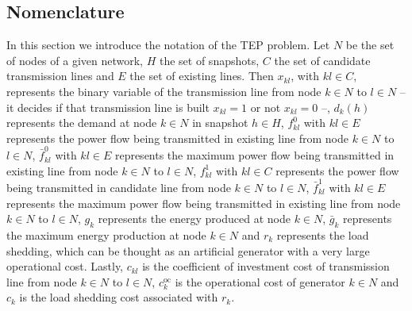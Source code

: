 \subsection{Nomenclature}
In this section we introduce the notation of the TEP problem. Let $N$ be the set of nodes of a given network, $H$ the set of snapshots, $C$ the set of candidate transmission lines and $E$ the set of existing lines. Then $x_{kl}$, with $kl \in C$, represents the binary variable of the transmission line from node $k\in N$ to $l\in N$ -- it decides if that transmission line is built $x_{kl} = 1$ or not $x_{kl} = 0$ --, $d_{k}(h)$ represents the demand at node $k\in N$ in snapshot $h\in H$, $f_{kl}^{0}$  with $kl \in E$ represents the power flow being transmitted in existing line from node $k\in N$ to $l\in N$, $\bar{f}_{kl}^{0}$  with $kl \in E$ represents the maximum power flow being transmitted in existing line from node $k\in N$ to $l\in N$, $f_{kl}^{1}$  with $kl \in C$ represents the power flow being transmitted in candidate line from node $k\in N$ to $l\in N$, $\bar{f}_{kl}^{1}$  with $kl \in E$ represents the maximum power flow being transmitted in existing line from node $k\in N$ to $l\in N$, $g_{k}$ represents the energy produced at node $k\in N$, $\bar{g}_{k}$ represents the maximum energy production at node $k\in N$ and $r_{k}$ represents the load shedding, which can be thought as an artificial generator with a very large operational cost. Lastly, $c_{kl}$ is the coefficient of investment cost of transmission line from node $k \in N$ to $l \in N$, $c_{k}^{\text{oc}}$ is the operational cost of generator $k \in N$ and $c_{k}$ is the load shedding cost associated with $r_{k}$.
